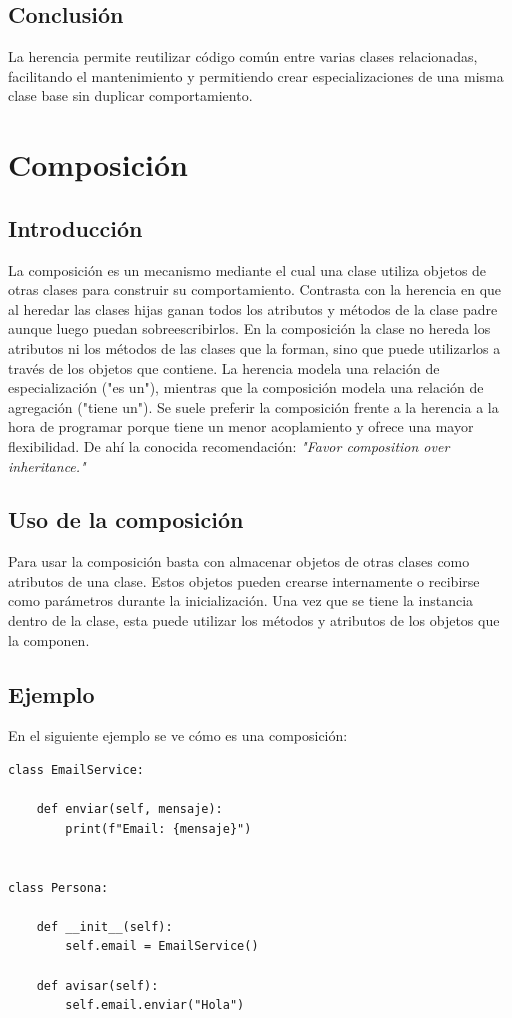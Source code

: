 \documentclass[11pt,a5paper,twoside]{book}
\begin{document}
\subsection{Conclusión}
La herencia permite reutilizar código común entre varias clases relacionadas, facilitando el mantenimiento y permitiendo crear especializaciones de una misma clase base sin duplicar comportamiento.

\newpage

\section{Composición}
\subsection{Introducción}
La composición es un mecanismo mediante el cual una clase utiliza objetos de otras clases para construir su comportamiento. 
Contrasta con la herencia en que al heredar las clases hijas ganan todos los atributos y métodos de la clase padre aunque luego puedan sobreescribirlos. En la composición la clase no hereda los atributos ni los métodos de las clases que la forman, sino que puede utilizarlos a través de los objetos que contiene. La herencia modela una relación de especialización ("es un"), mientras que la composición modela una relación de agregación ("tiene un").
Se suele preferir la composición frente a la herencia a la hora de programar porque tiene un menor acoplamiento y ofrece una mayor flexibilidad. De ahí la conocida recomendación: \textit{"Favor composition over inheritance."}
\subsection{Uso de la composición}
Para usar la composición basta con almacenar objetos de otras clases como atributos de una clase. Estos objetos pueden crearse internamente o recibirse como parámetros durante la inicialización.
Una vez que se tiene la instancia dentro de la clase, esta puede utilizar los métodos y atributos de los objetos que la componen.
\subsection{Ejemplo}
En el siguiente ejemplo se ve cómo es una composición:


\begin{tcolorbox}
\scriptsize
 \begin{verbatim}
class EmailService:

    def enviar(self, mensaje):
        print(f"Email: {mensaje}")


class Persona:

    def __init__(self):
        self.email = EmailService()

    def avisar(self):
        self.email.enviar("Hola")
\end{verbatim}
\end{tcolorbox}
 
\end{document}
